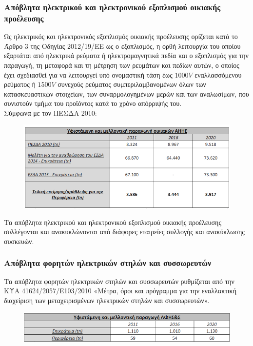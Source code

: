 \documentclass[12pt]{article}
\begin{document}
	\subsubsection{Απόβλητα ηλεκτρικού και ηλεκτρονικού εξοπλισμού οικιακής προέλευσης}
	
	Ως ηλεκτρικός και ηλεκτρονικός εξοπλισμός οικιακής προέλευσης ορίζεται κατά το Άρθρο 3 της Οδηγίας 2012/19/ΕΕ ως ο εξοπλισμός, η ορθή λειτουργία του οποίου εξαρτάται από ηλεκτρικά ρεύματα ή ηλεκτρομαγνητικά πεδία και ο εξοπλισμός για την παραγωγή, τη μεταφορά και τη μέτρηση των ρευμάτων και πεδίων αυτών, ο οποίος έχει σχεδιασθεί για να λειτουργεί υπό ονομαστική τάση έως $1000V$ εναλλασσόμενου ρεύματος ή $1500V$ συνεχούς ρεύματος συμπεριλαμβανομένων όλων των κατασκευαστικών στοιχείων, των συναρμολογημένων μερών και των αναλωσίμων, που συνιστούν τμήμα του προϊόντος κατά το χρόνο απόρριψής του. \\
	Σύμφωνα με τον ΠΕΣΔΑ 2010:
	
	\begin{figure} [H]
		\begin{center}
			\includegraphics [scale = 0.45] {table6.png}
		\end{center}
	\end{figure}

	Τα απόβλητα ηλεκτρικού και ηλεκτρονικού εξοπλισμού οικιακής προέλευσης συλλέγονται και ανακυκλώνονται από διάφορες εταιρείες συλλογής και ανακύκλωσης συσκευών.
	
	\subsubsection{Απόβλητα φορητών ηλεκτρικών στηλών  και συσσωρευτών}
	
	Τα απόβλητα φορητών ηλεκτρικών στηλών και συσσωρευτών ρυθμίζεται από την ΚΥΑ 41624/2057/Ε103/2010 «Μέτρα, όροι και πρόγραμμα για την εναλλακτική διαχείριση των μεταχειρισμένων ηλεκτρικών στηλών και συσσωρευτών».
	
	\begin{figure} [H]
		\begin{center}
			\includegraphics [scale = 0.45] {table7.png}
		\end{center}
	\end{figure}
\end{document}
